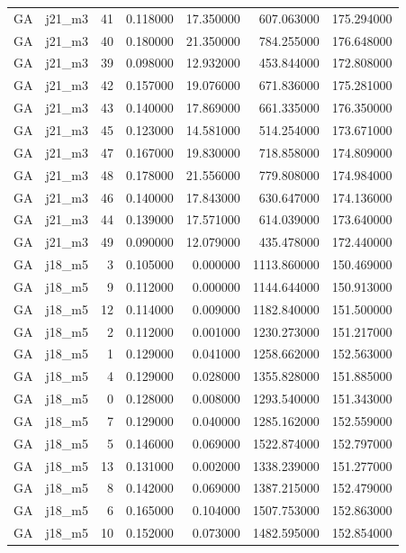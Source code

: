 \begin{tabular}{llrrrrr}
GA & j21_m3 & 41 & 0.118000 & 17.350000 & 607.063000 & 175.294000 \\
GA & j21_m3 & 40 & 0.180000 & 21.350000 & 784.255000 & 176.648000 \\
GA & j21_m3 & 39 & 0.098000 & 12.932000 & 453.844000 & 172.808000 \\
GA & j21_m3 & 42 & 0.157000 & 19.076000 & 671.836000 & 175.281000 \\
GA & j21_m3 & 43 & 0.140000 & 17.869000 & 661.335000 & 176.350000 \\
GA & j21_m3 & 45 & 0.123000 & 14.581000 & 514.254000 & 173.671000 \\
GA & j21_m3 & 47 & 0.167000 & 19.830000 & 718.858000 & 174.809000 \\
GA & j21_m3 & 48 & 0.178000 & 21.556000 & 779.808000 & 174.984000 \\
GA & j21_m3 & 46 & 0.140000 & 17.843000 & 630.647000 & 174.136000 \\
GA & j21_m3 & 44 & 0.139000 & 17.571000 & 614.039000 & 173.640000 \\
GA & j21_m3 & 49 & 0.090000 & 12.079000 & 435.478000 & 172.440000 \\
GA & j18_m5 & 3 & 0.105000 & 0.000000 & 1113.860000 & 150.469000 \\
GA & j18_m5 & 9 & 0.112000 & 0.000000 & 1144.644000 & 150.913000 \\
GA & j18_m5 & 12 & 0.114000 & 0.009000 & 1182.840000 & 151.500000 \\
GA & j18_m5 & 2 & 0.112000 & 0.001000 & 1230.273000 & 151.217000 \\
GA & j18_m5 & 1 & 0.129000 & 0.041000 & 1258.662000 & 152.563000 \\
GA & j18_m5 & 4 & 0.129000 & 0.028000 & 1355.828000 & 151.885000 \\
GA & j18_m5 & 0 & 0.128000 & 0.008000 & 1293.540000 & 151.343000 \\
GA & j18_m5 & 7 & 0.129000 & 0.040000 & 1285.162000 & 152.559000 \\
GA & j18_m5 & 5 & 0.146000 & 0.069000 & 1522.874000 & 152.797000 \\
GA & j18_m5 & 13 & 0.131000 & 0.002000 & 1338.239000 & 151.277000 \\
GA & j18_m5 & 8 & 0.142000 & 0.069000 & 1387.215000 & 152.479000 \\
GA & j18_m5 & 6 & 0.165000 & 0.104000 & 1507.753000 & 152.863000 \\
GA & j18_m5 & 10 & 0.152000 & 0.073000 & 1482.595000 & 152.854000 \\

\end{tabular}
